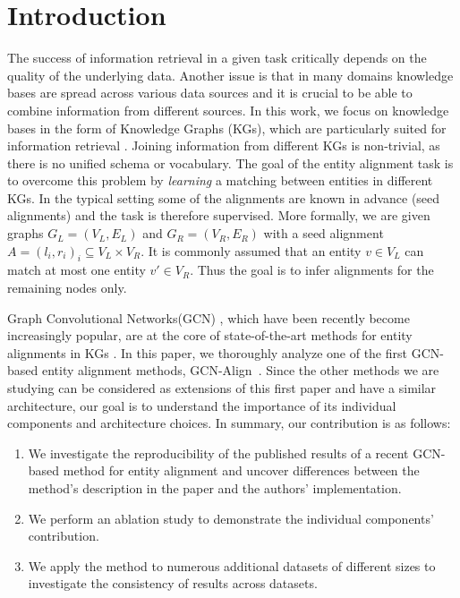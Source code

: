 \documentclass[runningheads]{llncs}
\begin{document}
\section{Introduction}
The success of information retrieval in a given task critically depends on the quality of the underlying data. Another issue is that in many domains knowledge bases are spread across various data sources \cite{nickel2015review} and it is crucial to be able to combine information from different sources.
In this work, we focus on knowledge bases in the form of Knowledge Graphs (KGs), which are particularly suited for information retrieval \cite{singhal2012introducing}.
Joining information from different KGs is non-trivial, as there is no unified schema or vocabulary. The goal of the entity alignment task is to overcome this problem by \emph{learning} a matching between entities in different KGs. In the typical setting some of the alignments are known in advance (seed alignments) and the task is therefore supervised. More formally, we are given graphs $G_L = (V_L, E_L)$ and $G_R = (V_R, E_R)$ 
with a seed alignment $A = {(l_i, r_i)}_i \subseteq V_L \times V_R$.
It is commonly assumed that an entity $v \in V_L$ can match at most one entity $v' \in V_R$.
Thus the goal is to infer alignments for the remaining nodes only.

Graph Convolutional Networks(GCN) \cite{kipf2016semi,gilmer2017neural}, which have been recently become increasingly popular, are at the core of state-of-the-art methods for entity alignments in KGs \cite{DBLP:conf/emnlp/WangLLZ18,DBLP:conf/acl/CaoLLLLC19,xu2019cross,DBLP:conf/ijcai/ZhuZ0TG19,anonymous2020deep}.
In this paper, we thoroughly analyze one of the first GCN-based entity alignment methods, GCN-Align~\cite{DBLP:conf/emnlp/WangLLZ18}.
Since the other methods we are studying can be considered as extensions of this first paper and have a similar architecture, our goal is to understand the importance of its individual components and architecture choices.
\noindent In summary, our contribution is as follows:
\begin{enumerate}
    \item We investigate the reproducibility of the published results of a recent GCN-based method for entity alignment and uncover differences between the method's description in the paper and the authors' implementation.
    \item We perform an ablation study to demonstrate the individual components' contribution.
    \item We apply the method to numerous additional datasets of different sizes to investigate the consistency of results across datasets.
\end{enumerate}
\end{document}
